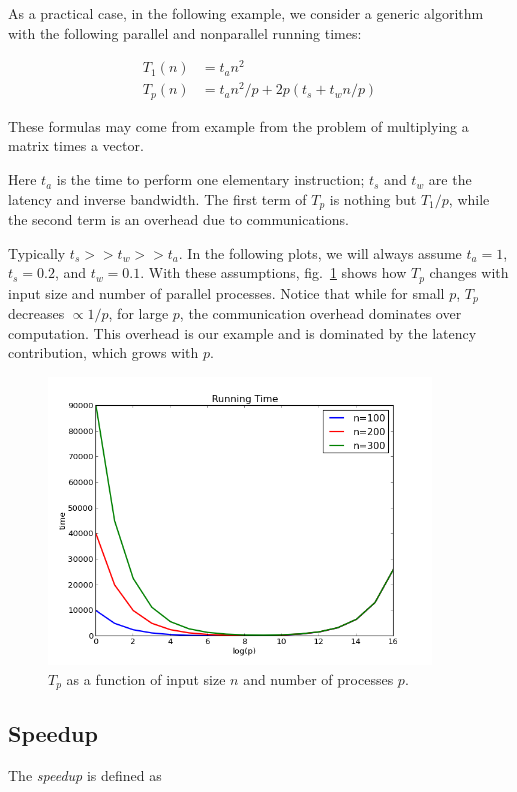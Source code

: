 \documentclass[justified,sixbynine]{tufte-book}
\theoremstyle{plain}%
\theoremstyle{definition}
\theoremstyle{remark}
\begin{document}
\begin{fullwidth}
As a practical case, in the following example, we consider a generic algorithm with the following parallel and nonparallel running times:

\begin{align}
T_1(n) &= t_a n^2 \\
T_p(n) &= t_a n^2 / p + 2p (t_s+t_w n/p)
\end{align}

These formulas may come from example from the problem of multiplying a matrix times a vector.

Here $t_a$ is the time to perform one elementary instruction; $t_s$ and $t_w$ are the latency and inverse bandwidth. The first term of $T_p$ is nothing but $T_1/p$, while the second term is an overhead due to communications.

Typically $t_s >> t_w >> t_a$. In the following plots, we will always assume $t_a=1$, $t_s=0.2$, and $t_w=0.1$. With these assumptions, fig.~\ref{Tp} shows how $T_p$ changes with input size and number of parallel processes. Notice that while for small $p$, $T_p$ decreases $\propto 1/p$, for large $p$, the communication overhead dominates over computation. This overhead is our example and is dominated by the latency contribution, which grows with $p$.

\begin{figure}[ht]
\centering\includegraphics[width=4in]{images/Tp.png}
\caption{$T_p$ as a function of input size $n$ and number of processes $p$.\label{Tp}}
\end{figure}

\goodbreak\subsection{Speedup}

The {\it speedup} is defined as


\end{fullwidth}
\end{document}

